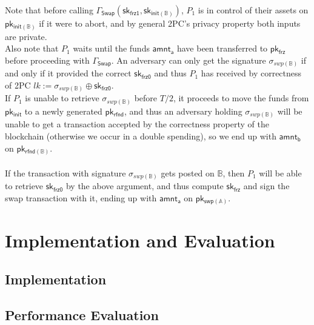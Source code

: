 \documentclass{article}      	%
\begin{document}
Note that before calling $\Gamma_{\mathsf{Swap}}(\mathsf{sk_{frz1}}, \mathsf{sk_{init(\mathbb{B})}})$, $P_1$ is in control of their assets on $\mathsf{pk_{init(\mathbb{B})}}$ if it were to abort, and by general 2PC's privacy property both inputs are private. \\
Also note that $P_1$ waits until the funds $\mathsf{amnt_a}$ have been transferred to $\mathsf{pk_{frz}}$ before proceeding with  $\Gamma_{\mathsf{Swap}}$.
An adversary can only get the signature $\sigma_{swp(\mathbb{B})}$ if and only if it provided the correct $\mathsf{sk_{frz0}}$ and thus $P_1$ has received by correctness of 2PC $lk := \sigma_{swp(\mathbb{B})} \oplus \mathsf{sk_{frz0}}$. \\
If $P_1$ is unable to retrieve $\sigma_{swp(\mathbb{B})}$ before $T/2$, it proceeds to move the funds from $\mathsf{pk_{init}}$ to a newly generated $\mathsf{pk_{rfnd}}$, and thus an adversary holding $\sigma_{swp(\mathbb{B})}$ will be unable to get a transaction accepted by the correctness property of the blockchain (otherwise we occur in a double spending), so we end up with  $\mathsf{amnt_b}$ on $\mathsf{pk_{rfnd(\mathbb{B})}}$. \\
\\
If the transaction with signature $\sigma_{swp(\mathbb{B})}$ gets posted on $\mathbb{B}$, then $P_1$ will be able to retrieve $\mathsf{sk_{frz0}}$ by the above argument, and thus compute $\mathsf{sk_{frz}}$ and sign the swap transaction with it, ending up with $\mathsf{amnt_a}$ on $\mathsf{pk_{swp(\mathbb{A})}}$.


\section{Implementation and Evaluation}

\subsection{Implementation}


\subsection{Performance Evaluation}


\printbibliography
\end{document}
